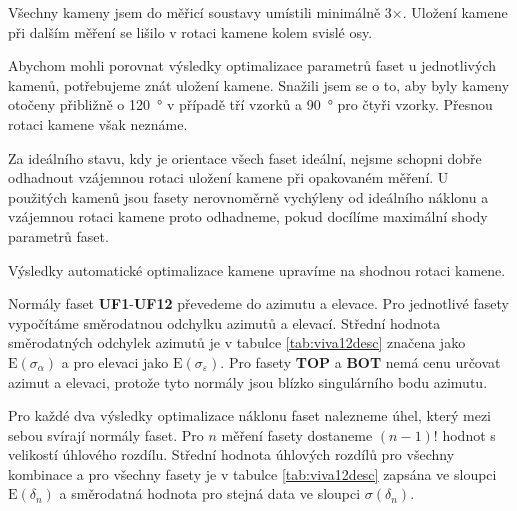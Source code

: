 	Všechny kameny jsem do měřicí soustavy umístili minimálně 3$\times$. Uložení kamene při dalším měření se lišilo v rotaci kamene kolem svislé osy.

	Abychom mohli porovnat výsledky optimalizace parametrů faset u jednotlivých kamenů, potřebujeme znát uložení kamene. Snažili jsem se o to, aby byly kameny otočeny přibližně o \SI{120}{\degree} v případě tří vzorků a \SI{90}{\degree} pro čtyři vzorky. Přesnou rotaci kamene však neznáme.
	
	Za ideálního stavu, kdy je orientace všech faset ideální, nejsme schopni dobře odhadnout vzájemnou rotaci uložení kamene při opakovaném měření. U použitých kamenů jsou fasety nerovnoměrně vychýleny od ideálního náklonu a vzájemnou rotaci kamene proto odhadneme, pokud docílíme maximální shody parametrů faset.   
	
	Výsledky automatické optimalizace kamene upravíme na shodnou rotaci kamene. 
	
	Normály faset \textbf{UF1}-\textbf{UF12} převedeme do azimutu a elevace. Pro jednotlivé fasety vypočítáme směrodatnou odchylku azimutů a elevací. Střední hodnota směrodatných odchylek azimutů je v tabulce \ref{tab:viva12desc} značena jako $\mathrm{E}(\sigma_{\alpha})$ a pro elevaci jako $\mathrm{E}(\sigma_{\varepsilon})$. Pro fasety \textbf{TOP} a \textbf{BOT} nemá cenu určovat azimut a elevaci, protože tyto normály jsou blízko singulárního bodu azimutu. 
	
	Pro každé dva výsledky optimalizace náklonu faset nalezneme úhel, který mezi sebou svírají normály faset. Pro $n$ měření fasety dostaneme $(n-1)!$ hodnot s velikostí úhlového rozdílu. Střední hodnota úhlových rozdílů pro všechny kombinace a pro všechny fasety je v tabulce \ref{tab:viva12desc} zapsána ve sloupci $\mathrm{E}(\delta_n)$ a směrodatná hodnota pro stejná data ve sloupci $\sigma(\delta_n)$. 

 \clearpage